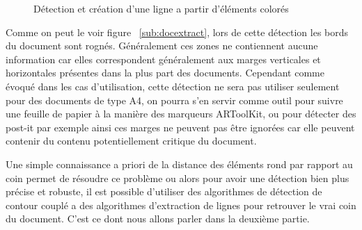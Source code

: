 \begin{figure}[H]
\centering
      \caption{Détection et création d'une ligne a partir d'éléments colorés}
      \label{fig:doc:linecluster}
\end{figure}

Comme on peut le voir figure ~\ref{sub:docextract}, lors de cette détection les bords du document sont rognés. Généralement ces zones ne contiennent aucune information car elles correspondent généralement aux marges verticales et horizontales présentes dans la plus part des documents. Cependant comme évoqué dans les cas d'utilisation, cette détection ne sera pas utiliser seulement pour des documents de type A4, on pourra s'en servir comme outil pour suivre une feuille de papier à la manière des marqueurs ARToolKit, ou pour détecter des post-it par exemple ainsi ces marges ne peuvent pas être ignorées car elle peuvent contenir du contenu potentiellement critique du document.

Une simple connaissance a priori de la distance des éléments rond par rapport au coin permet de résoudre ce problème ou alors pour avoir une détection bien plus précise et robuste, il est possible d'utiliser des algorithmes de détection de contour couplé a des algorithmes d'extraction de lignes pour retrouver le vrai coin du document. C'est ce dont nous allons parler dans la deuxième partie.

